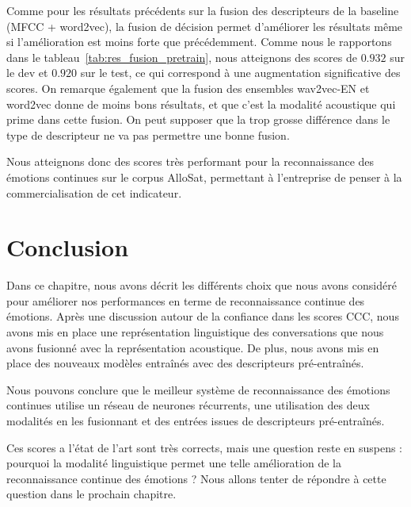 

Comme pour les résultats précédents sur la fusion des descripteurs de la baseline (MFCC + word2vec), la fusion de décision permet d'améliorer les résultats même si l'amélioration est moins forte que précédemment. Comme nous le rapportons dans le tableau~\ref{tab:res_fusion_pretrain}, nous atteignons des scores de $0.932$ sur le dev et $0.920$ sur le test, ce qui correspond à une augmentation significative des scores. On remarque également que la fusion des ensembles wav2vec-EN et word2vec donne de moins bons résultats, et que c'est la modalité acoustique qui prime dans cette fusion. On peut supposer que la trop grosse différence dans le type de descripteur ne va pas permettre une bonne fusion.

Nous atteignons donc des scores très performant pour la reconnaissance des émotions continues sur le corpus AlloSat, permettant à l'entreprise de penser à la commercialisation de cet indicateur.

\section{Conclusion}
Dans ce chapitre, nous avons décrit les différents choix que nous avons considéré pour améliorer nos performances en terme de reconnaissance continue des émotions. Après une discussion autour de la confiance dans les scores CCC, nous avons mis en place une représentation linguistique des conversations que nous avons fusionné avec la représentation acoustique. De plus, nous avons mis en place des nouveaux modèles entraînés avec des descripteurs pré-entraînés.

Nous pouvons conclure que le meilleur système de reconnaissance des émotions continues utilise un réseau de neurones récurrents, une utilisation des deux modalités en les fusionnant et des entrées issues de descripteurs pré-entraînés.

Ces scores a l'état de l'art sont très corrects, mais une question reste en suspens : pourquoi la modalité linguistique permet une telle amélioration de la reconnaissance continue des émotions ? Nous allons tenter de répondre à cette question dans le prochain chapitre.
